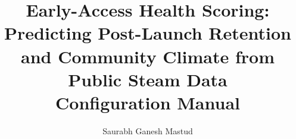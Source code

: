 \documentclass[12pt,a4paper]{article}
\newcommand{\myname}{Saurabh Ganesh Mastud}
\newcommand{\mytitle}{Early-Access Health Scoring: Predicting Post-Launch
Retention and Community Climate from Public Steam Data}
\begin{document}
\title{\mytitle \\ \vspace{0.4cm} \large Configuration Manual}%
\author{\myname}%
\date{}
\maketitle

\pagestyle{plain}










\end{document}

